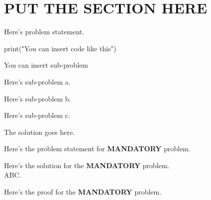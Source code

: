 \documentclass[a4paper, 10pt]{article}
\begin{document}
\subject[COURSE NAME]


\section{PUT THE SECTION HERE}



\begin{problem}
Here's problem statement.
\begin{codingbox}
print("You can insert code like this")
\end{codingbox}
You can insert sub-problem
\begin{subproblems}
    \item Here's sub-problem a.
    \item Here's sub-problem b.
    \item Here's sub-problem c.
\end{subproblems}
\end{problem}

\begin{solution}
The solution goes here.
\end{solution}


\begin{tosubmit}
\problem
Here's the problem statement for \textbf{MANDATORY} problem.

\par\noindent\submitsolution
Here's the solution for the \textbf{MANDATORY} problem. \\
ABC.

\proof
Here's the proof for the \textbf{MANDATORY} problem.
\end{tosubmit}
\end{document}
